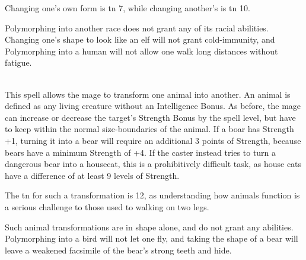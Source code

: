 \begin{multicols}{2}
Changing one's own form is \gls{tn} 7, while changing another's is \gls{tn} 10.

Polymorphing into another race does not grant any of its racial abilities.
Changing one's shape to look like an elf will not grant cold-immunity, and Polymorphing into a human will not allow one walk long distances without fatigue.

\\
This spell allows the mage to transform one animal into another.
An animal is defined as any living creature without an Intelligence Bonus.
As before, the mage can increase or decrease the target's Strength Bonus by the spell level,
but have to keep within the normal size-boundaries of the animal.
If a boar has Strength +1, turning it into a bear will require an additional 3 points of Strength, because bears have a minimum Strength of +4.
If the caster instead tries to turn a dangerous bear into a housecat, this is a prohibitively difficult task, as house cats have a difference of at least 9 levels of Strength.

The \gls{tn} for such a transformation is 12, as understanding how animals function is a serious challenge to those used to walking on two legs.

Such animal transformations are in shape alone, and do not grant any abilities.  Polymorphing into a bird will not let one fly, and taking the shape of a bear will leave a weakened facsimile of the bear's strong teeth and hide.


\iftoggle{verbose}{
While basic shapeshifters base their range on the Polymorph spell's level, a \textit{Bolstered} spell allows the caster to use a number of points equal to the spell's level plus their Intelligence Bonus.
If a shapeshifter cast this spell at the second level, with Intelligence +1, they could lower an animal's Strength Bonus by 3, or could turn a human into a gnome, since that requires a Strength adjustment of 3.

Those with the \textit{Realistic} enhancement also gain a number of \textit{Form Points} equal to the spell level plus the caster's Intelligence Bonus, instead of simply gaining points equal to the Spell's level.}{

The caster uses the spell level plus their Intelligence Bonus to determine all facets of the spell's potence, rather than just the spell's level.

}
\end{multicols}
